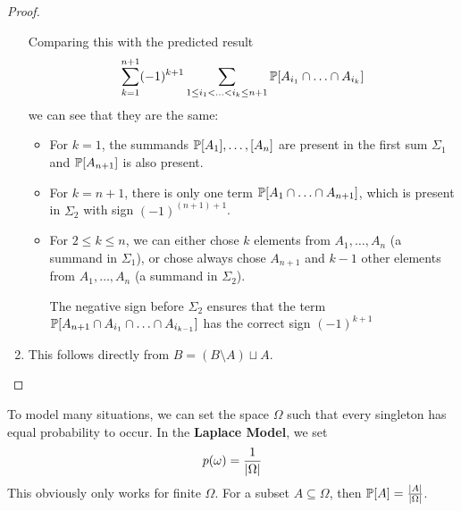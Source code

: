 \begin{proof}
\begin{enumerate}
    Comparing this with the predicted result
    \begin{align*}
      \sum_{k=1}^{n+1} (-1)^{k+1} \sum_{1 \leq i_1 < \ldots < i_k \leq n+1} \mathbb{P}[A_{i_1} \cap \ldots \cap A_{i_k}]
    \end{align*}
    we can see that they are the same:
    \begin{itemize}
      \item For $k = 1$, the summands $\mathbb{P}[A_1],\ldots,[A_n]$ are present in the first sum $\Sigma_1$ and $\mathbb{P}[A_{n+1}]$ is also present.
      \item For $k = n+1$, there is only one term $\mathbb{P}[A_1 \cap \ldots \cap A_{n+1}]$, which is present in $\Sigma_2$ with sign $(-1)^{(n+1)+1}$.

      \item For $2 \leq k \leq n$, we can either chose $k$ elements from $A_1, \ldots,A_n$ (a summand in $\Sigma_1$), or chose always chose $A_{n+1}$ and $k-1$ other elements from $A_1,\ldots,A_n$ (a summand in $\Sigma_2$).

        The negative sign before $\Sigma_2$ ensures that the term $\mathbb{P}[A_{n+1} \cap A_{i_1} \cap \ldots \cap A_{i_{k-1}}]$ has the correct sign $(-1)^{k+1}$
    \end{itemize}

  \item This follows directly from $B = (B \setminus A) \sqcup A$.
  \end{enumerate}
\end{proof}

\begin{ex}
To model many situations, we can set the space $\Omega$ such that every singleton has equal probability to occur.
In the \textbf{Laplace Model}, we set
\begin{align*}
  p(\omega) = \frac{1}{\vert\Omega\vert}
\end{align*}
This obviously only works for finite $\Omega$. 
For a subset $A \subseteq \Omega$, then $\mathbb{P}[A] = \frac{\vert A\vert}{\vert\Omega\vert}$.
\end{ex}

